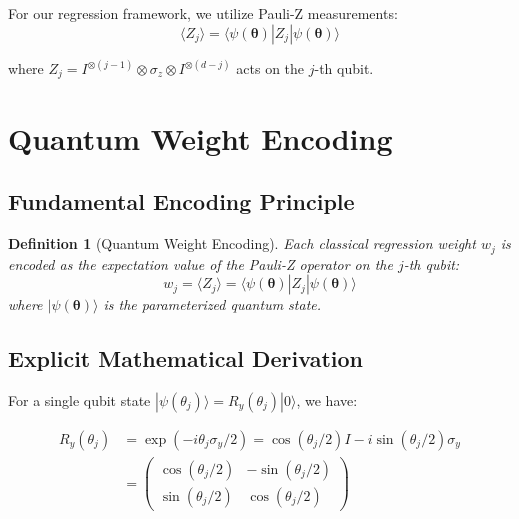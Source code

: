 \documentclass[11pt]{article}
\newtheorem{definition}[theorem]{Definition}
\begin{document}
For our regression framework, we utilize Pauli-Z measurements:
\begin{equation}
\langle Z_j \rangle = \langle \psi(\bm{\theta}) | Z_j | \psi(\bm{\theta}) \rangle
\label{eq:pauli_expectation}
\end{equation}

where $Z_j = I^{\otimes (j-1)} \otimes \sigma_z \otimes I^{\otimes (d-j)}$ acts on the $j$-th qubit.

\section{Quantum Weight Encoding}

\subsection{Fundamental Encoding Principle}

\begin{definition}[Quantum Weight Encoding]
Each classical regression weight $w_j$ is encoded as the expectation value of the Pauli-Z operator on the $j$-th qubit:
\begin{equation}
w_j = \langle Z_j \rangle = \langle \psi(\bm{\theta}) | Z_j | \psi(\bm{\theta}) \rangle
\label{eq:weight_encoding}
\end{equation}
where $|\psi(\bm{\theta})\rangle$ is the parameterized quantum state.
\end{definition}

\subsection{Explicit Mathematical Derivation}

For a single qubit state $|\psi(\theta_j)\rangle = R_y(\theta_j)|0\rangle$, we have:

\begin{align}
R_y(\theta_j) &= \exp(-i\theta_j \sigma_y/2) = \cos(\theta_j/2)I - i\sin(\theta_j/2)\sigma_y \\
&= \begin{pmatrix}
\cos(\theta_j/2) & -\sin(\theta_j/2) \\
\sin(\theta_j/2) & \cos(\theta_j/2)
\end{pmatrix}
\end{align}
\end{document}
